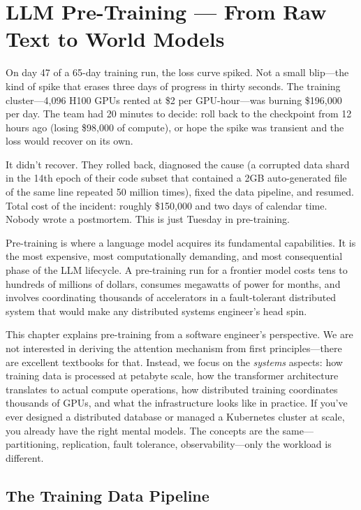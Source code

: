 \chapter{LLM Pre-Training --- From Raw Text to World Models}
\label{ch:pretraining}

\noindent
On day 47 of a 65-day training run, the loss curve spiked. Not a small blip---the kind of spike that erases three days of progress in thirty seconds. The training cluster---4,096 H100 GPUs rented at \$2 per GPU-hour---was burning \$196,000 per day. The team had 20 minutes to decide: roll back to the checkpoint from 12 hours ago (losing \$98,000 of compute), or hope the spike was transient and the loss would recover on its own.

It didn't recover. They rolled back, diagnosed the cause (a corrupted data shard in the 14th epoch of their code subset that contained a 2GB auto-generated file of the same line repeated 50 million times), fixed the data pipeline, and resumed. Total cost of the incident: roughly \$150,000 and two days of calendar time. Nobody wrote a postmortem. This is just Tuesday in pre-training.

Pre-training is where a language model acquires its fundamental capabilities. It is the most expensive, most computationally demanding, and most consequential phase of the LLM lifecycle. A pre-training run for a frontier model costs tens to hundreds of millions of dollars, consumes megawatts of power for months, and involves coordinating thousands of accelerators in a fault-tolerant distributed system that would make any distributed systems engineer's head spin.

This chapter explains pre-training from a software engineer's perspective. We are not interested in deriving the attention mechanism from first principles---there are excellent textbooks for that. Instead, we focus on the \emph{systems} aspects: how training data is processed at petabyte scale, how the transformer architecture translates to actual compute operations, how distributed training coordinates thousands of GPUs, and what the infrastructure looks like in practice. If you've ever designed a distributed database or managed a Kubernetes cluster at scale, you already have the right mental models. The concepts are the same---partitioning, replication, fault tolerance, observability---only the workload is different.


\section{The Training Data Pipeline}
\label{sec:training-data}

